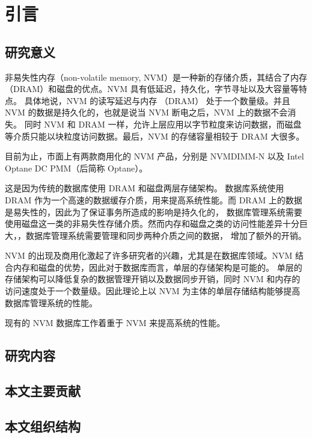 
\chapter{引言}

\section{研究意义}



非易失性内存（non-volatile memory, NVM）是一种新的存储介质，其结合了内存 （DRAM）和磁盘的优点。NVM 具有低延迟，持久化，字节寻址以及大容量等特点。
具体地说，NVM 的读写延迟与内存 （DRAM） 处于一个数量级。并且 NVM 的数据是持久化的，也就是说当 NVM 断电之后，NVM 上的数据不会消失。
同时 NVM 和 DRAM 一样，允许上层应用以字节粒度来访问数据，而磁盘等介质只能以块粒度访问数据。最后，NVM 的存储容量相较于 DRAM 大很多。

目前为止，市面上有两款商用化的 NVM 产品，分别是 NVMDIMM-N 以及 Intel Optane DC PMM（后简称 Optane）。\cite{zhangkun1994}


这是因为传统的数据库使用 DRAM 和磁盘两层存储架构。
数据库系统使用 DRAM 作为一个高速的数据缓存介质，用来提高系统性能。而 DRAM 上的数据是易失性的，因此为了保证事务所造成的影响是持久化的，
数据库管理系统需要使用磁盘这一类的非易失性存储介质。然而内存和磁盘之类的访问性能差异十分巨大，，数据库管理系统需要管理和同步两种介质之间的数据，
增加了额外的开销。

NVM 的出现及商用化激起了许多研究者的兴趣，尤其是在数据库领域。NVM 结合内存和磁盘的优势，因此对于数据库而言，单层的存储架构是可能的。
单层的存储架构可以降低复杂的数据管理开销以及数据同步开销，同时 NVM 和内存的访问速度处于一个数量级。因此理论上以 NVM 为主体的单层存储结构能够提高数据库管理系统的性能。

现有的 NVM 数据库工作着重于 NVM 来提高系统的性能。

\section{研究内容}

\section{本文主要贡献}

\section{本文组织结构}

